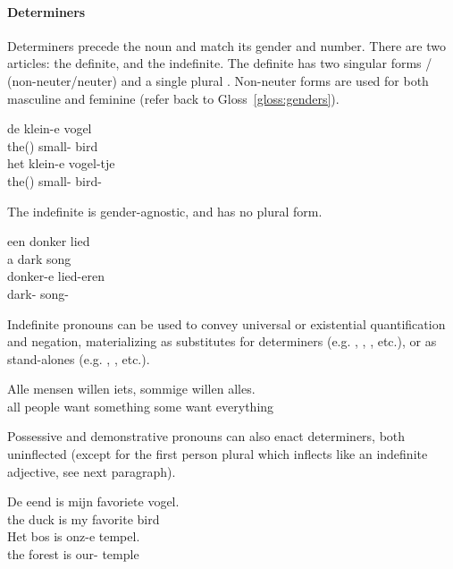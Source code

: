 \paragraph{Determiners}
Determiners precede the noun and match its gender and number.
There are two articles: the definite, and the indefinite.
The definite has two singular forms / (non-neuter/neuter) and a single plural . 
Non-neuter forms are used for both masculine and feminine (refer back to Gloss~\ref{gloss:genders}).
\begin{exe}
\ex\label{gloss:gender_change}
\begin{xlist}
\ex
\gll de klein-e vogel\\
the() small- bird\\
\ex
\gll het klein-e vogel-tje\\
the() small- bird-\\
\end{xlist}
\end{exe}
The indefinite  is gender-agnostic, and has no plural form.
\begin{exe}
\ex
\begin{xlist}
\ex\label{gloss:indef_adj_sg_n}
\gll een donker lied\\
a dark song\\
\ex 
\gll donker-e lied-eren\\
dark- song-\\
\end{xlist}
\end{exe}
Indefinite pronouns can be used to convey universal or existential quantification and negation, materializing as substitutes for determiners (e.g. , , , etc.), or as stand-alones (e.g. , , etc.).
\begin{exe}
\ex
\gll Alle mensen willen iets, sommige willen alles.\\
all people want something some want everything\\
\end{exe}
Possessive and demonstrative pronouns can also enact determiners, both uninflected (except for the first person plural  which inflects like an indefinite adjective, see next paragraph).
\begin{exe}
\ex
\gll De eend is mijn favoriete vogel.\\
the duck is my favorite bird\\
\ex\label{gloss:ido}
\gll Het bos is onz-e tempel.\\
the forest is our- temple\\
\end{exe}
